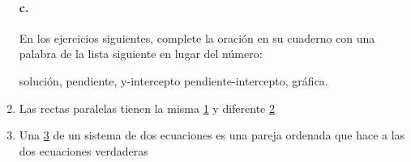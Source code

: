 \documentclass[twoside]{article}
\begin{document}
\begin{enumerate}
\paragraph*{c.} En los ejercicios siguientes, complete la oración en su cuaderno con una palabra de la lista siguiente en lugar del número:

solución, pendiente, y-intercepto pendiente-intercepto, gráfica.
\item Las rectas paralelas tienen la misma \underline{\hspace*{5pt}1\hspace*{5pt}} y diferente \underline{\hspace*{5pt}2\hspace*{5pt}}
\item Una \underline{\hspace*{5pt}3\hspace*{5pt}} de un sistema de dos ecuaciones es una pareja ordenada que hace a las dos ecuaciones verdaderas
\end{enumerate}
\end{document}
